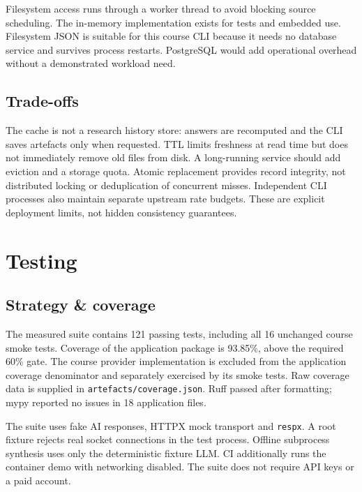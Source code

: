 \documentclass[11pt,a4paper]{article}
\begin{document}
Filesystem access runs through a worker thread to avoid blocking source scheduling. The in-memory implementation exists for tests and embedded use. Filesystem JSON is suitable for this course CLI because it needs no database service and survives process restarts. PostgreSQL would add operational overhead without a demonstrated workload need.

\subsection{Trade-offs}
The cache is not a research history store: answers are recomputed and the CLI saves artefacts only when requested. TTL limits freshness at read time but does not immediately remove old files from disk. A long-running service should add eviction and a storage quota. Atomic replacement provides record integrity, not distributed locking or deduplication of concurrent misses. Independent CLI processes also maintain separate upstream rate budgets. These are explicit deployment limits, not hidden consistency guarantees.

\clearpage
\section{Testing}
\subsection{Strategy \& coverage}
The measured suite contains 121 passing tests, including all 16 unchanged course smoke tests. Coverage of the application package is 93.85\%, above the required 60\% gate. The course provider implementation is excluded from the application coverage denominator and separately exercised by its smoke tests. Raw coverage data is supplied in \texttt{artefacts/coverage.json}. Ruff passed after formatting; mypy reported no issues in 18 application files.

The suite uses fake AI responses, HTTPX mock transport and \texttt{respx}. A root fixture rejects real socket connections in the test process. Offline subprocess synthesis uses only the deterministic fixture LLM. CI additionally runs the container demo with networking disabled. The suite does not require API keys or a paid account.
\end{document}
